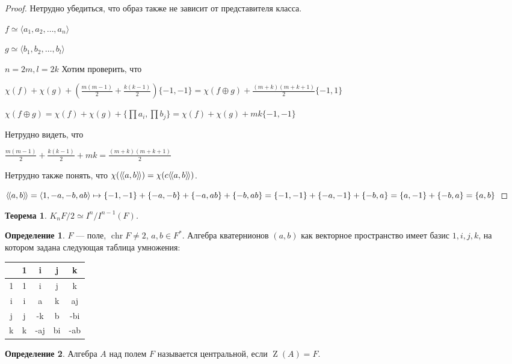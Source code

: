 \documentclass{article}
\newtheorem*{theorem}{Теорема}
\theoremstyle{definition}
\newtheorem*{definition}{Определение}
\theoremstyle{remark}
\DeclareMathOperator{\chr}{chr}
\DeclareMathOperator{\cnt}{Z}
\newcommand{\llangle}{\langle \hspace{-.5mm} \langle}
\newcommand{\rrangle}{\rangle \hspace{-.5mm} \rangle}
\begin{document}
\begin{proof}
    Нетрудно убедиться, что образ также не зависит от представителя класса.

    $f \simeq \langle a_1, a_2, \ldots, a_n \rangle$

    $g \simeq \langle b_1, b_2, \ldots, b_l \rangle$

    $n = 2m, l = 2k$
    Хотим проверить, что
    
    $\chi(f) + \chi(g) + \left(\frac{m(m - 1)}{2} + \frac{k(k - 1)}{2}\right)\{-1, -1\} = \chi(f \oplus g) + \frac{(m + k)(m + k + 1)}{2}\{-1, 1\}$

    $\chi(f \oplus g) = \chi(f) + \chi(g) + \{\prod a_i, \prod b_j\} = \chi(f) + \chi(g) + mk\{-1, -1\}$

    Нетрудно видеть, что

    $\frac{m(m-1)}{2} + \frac{k(k - 1)}{2} + mk = \frac{(m + k)(m + k + 1)}{2}$

    Нетрудно также понять, что $\chi(\llangle a, b \rrangle) = \chi(c\llangle a, b \rrangle)$.

    $\llangle a, b \rrangle = \langle 1, -a, -b, ab \rangle \mapsto \{-1, -1\} + \{-a, -b\} + \{-a, ab\} + \{-b, ab\} = \{-1, -1\} + \{-a, -1\} + \{-b, a\} = \{a, -1\} + \{-b, a\} = \{a, b\}$
\end{proof}

 \begin{theorem}
    $K_nF / 2 \simeq I^n / I^{n - 1}(F)$.
\end{theorem}

\begin{definition}
    $F$ --- поле, $\chr F \neq 2$, $a, b \in F^*$. Алгебра кватернионов $(a, b)$ как векторное пространство имеет базис $1, i, j, k$, на котором задана следующая таблица умножения:
    \begin{table}[h!]
        \begin{tabular}{C|C|C|C|C}
            & 1 & i & j & k \\  & 1 & i & j & k \\ \hline
            i & i & a & k & aj \\ \hline
            j & j & -k & b & -bi \\ \hline
            k & k & -aj & bi & -ab
        \end{tabular}
    \end{table}
\end{definition}

\begin{definition}
    Алгебра $A$ над полем $F$ называется центральной, если $\cnt(A) = F$.
\end{definition}
\end{document}
